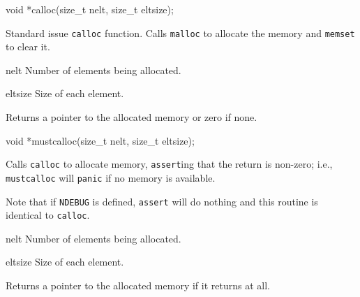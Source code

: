 \label{calloc}
\begin{apisyn}

	\funcproto void *calloc(size_t nelt, size_t eltsize);
\end{apisyn}
\begin{apidesc}
	Standard issue {\tt calloc} function.
	Calls {\tt malloc} to allocate the memory and
	{\tt memset} to clear it.
\end{apidesc}
\begin{apiparm}
	\item[nelt]
		Number of elements being allocated.
	\item[eltsize]
		Size of each element.
\end{apiparm}
\begin{apiret}
	Returns a pointer to the allocated memory or zero if none.
\end{apiret}

\label{mustcalloc}
\begin{apisyn}

	\funcproto void *mustcalloc(size_t nelt, size_t eltsize);
\end{apisyn}
\begin{apidesc}
	Calls {\tt calloc} to allocate memory,
	{\tt assert}ing that the return is non-zero;
	i.e., {\tt mustcalloc} will {\tt panic} if no memory is available.

	Note that if {\tt NDEBUG} is defined, {\tt assert} will do
	nothing and this routine is identical to {\tt calloc}.
\end{apidesc}
\begin{apiparm}
	\item[nelt]
		Number of elements being allocated.
	\item[eltsize]
		Size of each element.
\end{apiparm}
\begin{apiret}
	Returns a pointer to the allocated memory if it returns at all.
\end{apiret}

